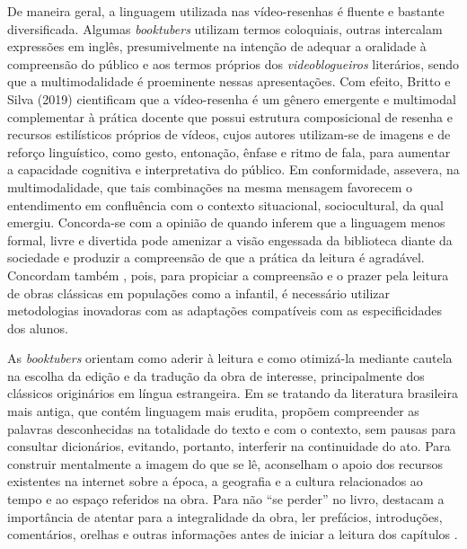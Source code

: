 \documentclass[portuguese]{textolivre}
\begin{document}
De maneira geral, a linguagem utilizada nas vídeo-resenhas é fluente e
bastante diversificada. Algumas \emph{booktubers} utilizam termos
coloquiais, outras intercalam expressões em inglês, presumivelmente na
intenção de adequar a oralidade à compreensão do público e aos termos
próprios dos \emph{videoblogueiros} literários, sendo que a
multimodalidade é proeminente nessas apresentações. Com efeito, Britto e
Silva (2019) cientificam que a vídeo-resenha é um gênero emergente e
multimodal complementar à prática docente que possui estrutura
composicional de resenha e recursos estilísticos próprios de vídeos,
cujos autores utilizam-se de imagens e de reforço linguístico, como
gesto, entonação, ênfase e ritmo de fala, para aumentar a capacidade
cognitiva e interpretativa do público. Em conformidade, \textcite{Pena2020} %
assevera, na multimodalidade, que tais combinações na mesma mensagem
favorecem o entendimento em confluência com o contexto situacional,
sociocultural, da qual emergiu. Concorda-se com a opinião de \textcite{oliveira2021booktubers} %
quando inferem que a linguagem menos formal, livre
e divertida pode amenizar a visão engessada da biblioteca diante da
sociedade e produzir a compreensão de que a prática da leitura é
agradável. Concordam também \textcite{RomeroOliva2021}, %
pois, para propiciar a compreensão e o prazer pela leitura de
obras clássicas em populações como a infantil, é necessário utilizar
metodologias inovadoras com as adaptações compatíveis com as
especificidades dos alunos.

As \emph{booktubers} orientam como aderir à leitura e como otimizá-la
mediante cautela na escolha da edição e da tradução da obra de
interesse, principalmente dos clássicos originários em língua
estrangeira. Em se tratando da literatura brasileira mais antiga, que
contém linguagem mais erudita, propõem compreender as palavras
desconhecidas na totalidade do texto e com o contexto, sem pausas para
consultar dicionários, evitando, portanto, interferir na continuidade do
ato. Para construir mentalmente a imagem do que se lê, aconselham o
apoio dos recursos existentes na internet sobre a época, a geografia e a
cultura relacionados ao tempo e ao espaço referidos na obra. Para não
``se perder'' no livro, destacam a importância de atentar para a
integralidade da obra, ler prefácios, introduções, comentários, orelhas
e outras informações antes de iniciar a leitura dos capítulos \cite{lubrano2021}. %
\end{document}

